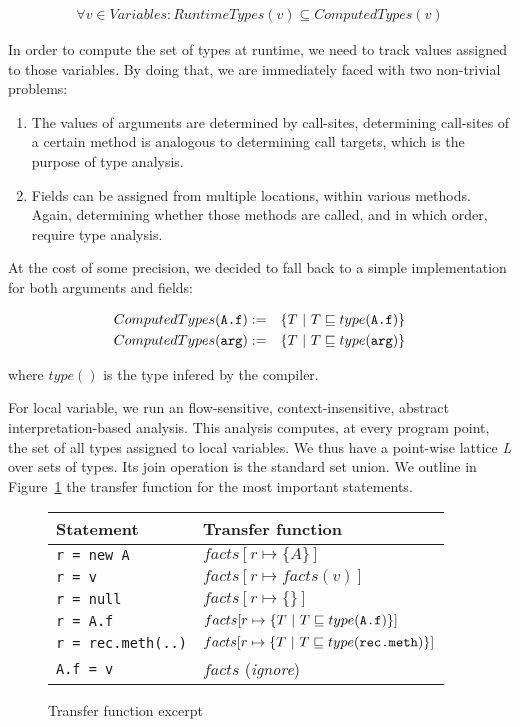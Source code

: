 \begin{eqnarray*}
    \forall v \in Variables: RuntimeTypes(v) \subseteq ComputedTypes(v)
\end{eqnarray*}

In order to compute the set of types at runtime, we need to track values
assigned to those variables. By doing that, we are immediately faced with two
non-trivial problems:
\begin{enumerate}
    \item The values of arguments are determined by call-sites, determining
    call-sites of a certain method is analogous to determining call targets,
    which is the purpose of type analysis.

    \item Fields can be assigned from multiple locations, within various
    methods. Again, determining whether those methods are
    called, and in which order, require type analysis.
\end{enumerate}

At the cost of some precision, we decided to fall back to a simple
implementation for both arguments and fields:

\begin{eqnarray*}
    ComputedTypes(\verb/A.f/) &:=& \{ T ~|~ T \subtype type(\verb/A.f/) \} \\
    ComputedTypes(\verb/arg/) &:=& \{ T ~|~ T \subtype type(\verb/arg/) \} \\
\end{eqnarray*}

where $type()$ is the type infered by the compiler.

For local variable, we run an flow-sensitive, context-insensitive, abstract
interpretation-based analysis. This analysis computes, at every program point,
the set of all types assigned to local variables. We thus have a point-wise
lattice \emph{L} over sets of types. Its join operation is the standard set
union. We outline in Figure~\ref{fig:ta:tf} the transfer function for the most
important statements.
\FloatBarrier
\begin{figure}[h]
    \centering

    \begin{tabular}{ l | l }
        Statement                 & Transfer function \\
        \hline
        \verb/r = new A/          & $facts[ r \mapsto \{ A \}]$ \\
        \verb/r = v/              & $facts[ r \mapsto facts(v)]$ \\
        \verb/r = null/           & $facts[ r \mapsto \{ \}]$ \\
        \verb/r = A.f/            & $facts[ r \mapsto \{ T ~|~ T \subtype type(\verb/A.f/)\}]$ \\
        \verb/r = rec.meth(..)/   & $facts[ r \mapsto \{ T ~|~ T \subtype type(\verb/rec.meth/)\}]$ \\
        \verb/A.f = v/            & $facts$ (\emph{ignore}) \\
    \end{tabular}

    \caption{Transfer function excerpt}
    \label{fig:ta:tf}
\end{figure}

